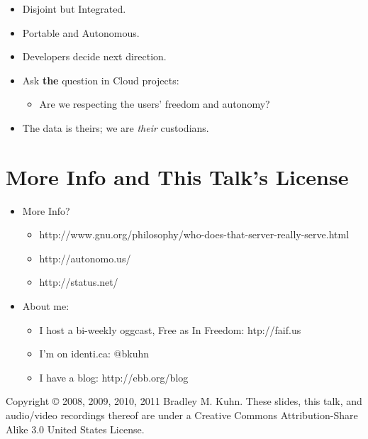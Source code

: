 \documentclass{article}
\begin{document}
\begin{itemize}
\item 
  Disjoint but Integrated.

\item 
  Portable and Autonomous.

\item 
  Developers decide next direction.

\item 
  Ask \textbf{the} question in Cloud projects:
  \begin{itemize}
  \item 
    Are we respecting the users' freedom and autonomy?
  \end{itemize}
\item 
  The data is theirs; we are \emph{their} custodians.

\end{itemize}
\section{More Info and This Talk's License}

\begin{itemize}
\item 
  More Info?
  \begin{itemize}
  \item 
    http://www.gnu.org/philosophy/who-does-that-server-really-serve.html
  \item 
    http://autonomo.us/
  \item 
    http://status.net/
  \end{itemize}
\item 
  About me:
  \begin{itemize}
  \item 
    I host a bi-weekly oggcast, Free as In Freedom: htp://faif.us
  \item 
    I'm on identi.ca: @bkuhn
  \item 
    I have a blog: http://ebb.org/blog
  \end{itemize}
\end{itemize}
Copyright © 2008, 2009, 2010, 2011 Bradley M. Kuhn. These slides,
this talk, and audio/video recordings thereof are under a Creative
Commons Attribution-Share Alike 3.0 United States License.
\end{document}
